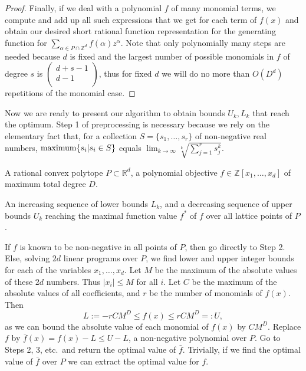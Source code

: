 \documentclass[twoside]{article}
\newcommand{\R}{\mathbb R}
\newcommand{\Z}{\mathbb Z}
\newcommand{\1}{{\bf 1}}
\begin{document}
\begin{proof}
Finally, if we deal with a polynomial $f$ of many monomial terms, we
compute and add up all such expressions that we get for each term of $f(x)$ and
obtain our desired short rational function representation for the
generating function for $ \sum_{\alpha\in P \cap \Z^d} f(\alpha)
z^\alpha.$ Note that only polynomially many steps are needed because
$d$ is fixed and the largest number of possible monomials in $f$ 
of degree $s$ is $\left(\begin{smallmatrix}d+s-1\\ d-1\\
  \end{smallmatrix}\right)$, thus for fixed $d$ we will do no more than
$O(D^{d})$ repetitions of the monomial case.
\end{proof}

Now we are ready to present our algorithm to obtain bounds $U_k,L_k$
that reach the optimum.  Step 1 of preprocessing is necessary because
we rely on the elementary fact that, for a collection
$S=\{s_1,\dots,s_r\}$ of non-negative real numbers, $\hbox{\rm
  maximum} \{s_i | s_i \in S \}$ equals $\lim_{k \rightarrow \infty}
\sqrt[k]{\sum_{j=1}^r s_j^k}.$

 \label{Algorithm}

 A rational convex polytope $P \subset \R^d$, 
a polynomial objective $f \in \Z[x_1,\dots,x_d]$ of maximum total degree $D$.

 An increasing sequence of lower bounds $L_k$,
and a decreasing sequence of upper bounds $U_k$ reaching the maximal
function value $f^*$ of $f$ over all lattice points of $P$.

 If $f$ is known to be 
non-negative in all points of $P$, then go directly to Step 2. 
Else, solving $2d$ linear programs over $P$, we
find lower and upper integer bounds for each of the variables
$x_1,\ldots,x_d$. Let $M$ be the maximum of the absolute values of
these $2d$ numbers. Thus $|x_i|\leq M$ for all $i$. Let $C$ be the
maximum of the absolute values of all coefficients, and $r$ be the
number of monomials of $f(x)$.  Then
\[
L:=-rCM^D\leq f(x)\leq rCM^D=:U,
\]
as we can bound the absolute value of each monomial of $f(x)$ by
$CM^D$. Replace $f$ by $\bar{f}(x)=f(x)-L\leq U-L$, a non-negative
polynomial over $P$. Go to Steps 2, 3, etc.~and return the optimal
value of $\bar{f}.$ Trivially, if we find the optimal value of
$\bar{f}$ over $P$ we can extract the optimal value for $f$.
\end{document}

